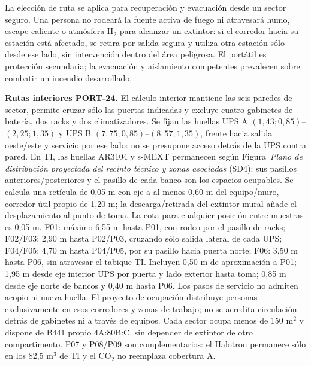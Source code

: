 La elección de ruta se aplica para recuperación y evacuación desde un sector seguro. Una persona no rodeará la fuente activa de fuego ni atravesará humo, escape caliente o atmósfera H$_2$ para alcanzar un extintor: si el corredor hacia su estación está afectado, se retira por salida segura y utiliza otra estación sólo desde ese lado, sin intervención dentro del área peligrosa. El portátil es protección secundaria; la evacuación y aislamiento competentes prevalecen sobre combatir un incendio desarrollado.

\textbf{Rutas interiores PORT-24.} El cálculo interior mantiene las seis paredes de sector, permite cruzar sólo las puertas indicadas y excluye cuatro gabinetes de batería, dos racks y dos climatizadores. Se fijan las huellas UPS A $(1,43;0,85)$--$(2,25;1,35)$ y UPS B $(7,75;0,85)$--$(8,57;1,35)$, frente hacia salida oeste/este y servicio por ese lado: no se presupone acceso detrás de la UPS contra pared. En TI, las huellas AR3104 y s-MEXT permanecen según Figura~\emph{Plano de distribución proyectada del recinto técnico y zonas asociadas} (SD4); sus pasillos anteriores/posteriores y el pasillo de cada banco son los espacios ocupables. Se calcula una retícula de 0,05 m con eje a al menos 0,60 m del equipo/muro, corredor útil propio de 1,20 m; la descarga/retirada del extintor mural añade el desplazamiento al punto de toma. La cota para cualquier posición entre muestras es 0,05 m. F01: máximo 6,55 m hasta P01, con rodeo por el pasillo de racks; F02/F03: 2,90 m hasta P02/P03, cruzando sólo salida lateral de cada UPS; F04/F05: 4,70 m hasta P04/P05, por su pasillo hacia puerta norte; F06: 3,50 m hasta P06, sin atravesar el tabique TI. Incluyen 0,50 m de aproximación a P01; 1,95 m desde eje interior UPS por puerta y lado exterior hasta toma; 0,85 m desde eje norte de bancos y 0,40 m hasta P06. Los pasos de servicio no admiten acopio ni nueva huella. El proyecto de ocupación distribuye personas exclusivamente en esos corredores y zonas de trabajo; no se acredita circulación detrás de gabinetes ni a través de equipos. Cada sector ocupa menos de 150 m$^2$ y dispone de B441 propio 4A:80B:C, sin depender de extintor de otro compartimento. P07 y P08/P09 son complementarios: el Halotron permanece sólo en los 82,5 m$^3$ de TI y el CO$_2$ no reemplaza cobertura A.
